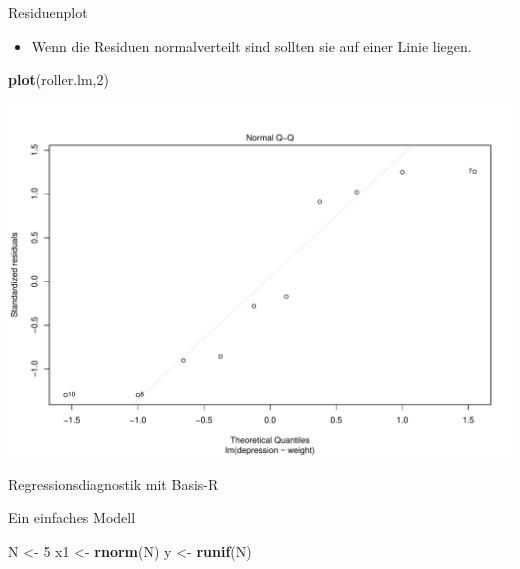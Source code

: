\documentclass[ignorenonframetext,]{beamer}
\newenvironment{Shaded}{}{}
\newcommand{\KeywordTok}[1]{\textcolor[rgb]{0.00,0.44,0.13}{\textbf{{#1}}}}
\newcommand{\DecValTok}[1]{\textcolor[rgb]{0.25,0.63,0.44}{{#1}}}
\newcommand{\StringTok}[1]{\textcolor[rgb]{0.25,0.44,0.63}{{#1}}}
\newcommand{\NormalTok}[1]{{#1}}
\providecommand{\tightlist}{%
\setlength{\itemsep}{0pt}\setlength{\parskip}{0pt}}
\begin{document}
\begin{frame}[fragile]{Residuenplot}

\begin{itemize}
\tightlist
\item
  Wenn die Residuen normalverteilt sind sollten sie auf einer Linie
  liegen.
\end{itemize}

\begin{Shaded}
\begin{Highlighting}[]
\KeywordTok{plot}\NormalTok{(roller.lm,}\DecValTok{2}\NormalTok{)}
\end{Highlighting}
\end{Shaded}

\includegraphics{R_intern_files/figure-beamer/unnamed-chunk-301-1.pdf}

\end{frame}

\begin{frame}[fragile]{Regressionsdiagnostik mit Basis-R}

Ein einfaches Modell

\begin{Shaded}
\begin{Highlighting}[]
\NormalTok{N <-}\StringTok{ }\DecValTok{5}
\NormalTok{x1 <-}\StringTok{ }\KeywordTok{rnorm}\NormalTok{(N)}
\NormalTok{y <-}\StringTok{ }\KeywordTok{runif}\NormalTok{(N)}
\end{Highlighting}
\end{Shaded}

\end{frame}
\end{document}
